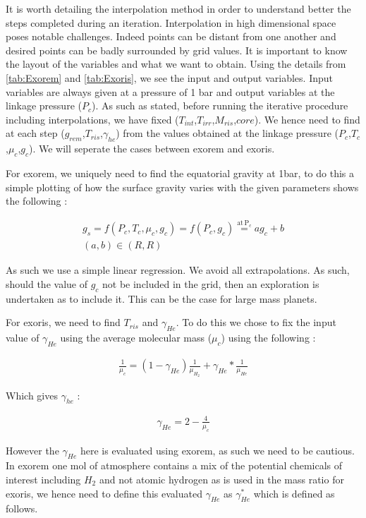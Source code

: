 It is worth detailing the interpolation method in order to understand better the steps completed during an iteration. Interpolation in high dimensional space poses notable challenges. Indeed points can be distant from one another and desired points can be badly surrounded by grid values. It is important to know the layout of the variables and what we want to obtain. Using the details from \cref{tab:Exorem} and \cref{tab:Exoris}, we see the input and output variables. Input variables are always given at a pressure of 1 bar and output variables at the linkage pressure ($P_c$). As such as stated, before running the iterative procedure including interpolations, we have fixed ($T_{int}$,$T_{irr}$,$M_{ris}$,$core$). We hence need to find at each step ($g_{rem}$,$T_{ris}$,$\gamma_{he}$) from the values obtained at the linkage pressure ($P_c$,$T_c$,$\mu_c$,$g_c$). We will seperate the cases between exorem and exoris.\par

For exorem, we uniquely need to find the equatorial gravity at 1bar, to do this a simple plotting of how the surface gravity varies with the given parameters shows the following :

\begin{align} 
    g_s = f(P_c,T_c,\mu_c,g_c) = f(P_c, g_c) \overset{\mathrm{at \, P_c}}{=} ag_c + b \\
    (a,b) \in (R,R) \nonumber
\end{align}

As such we use a simple linear regression. We avoid all extrapolations. As such, should the value of $g_c$ not be included in the grid, then an exploration is undertaken as to include it. This can be the case for large mass planets.\par

For exoris, we need to find $T_{ris}$ and $\gamma_{He}$. To do this we chose to fix the input value of $\gamma_{He}$ using the average molecular mass ($\mu_c$) using the following :

\begin{align} 
    \frac{1}{\mu_c} = (1-\gamma_{He})\frac{1}{\mu_{H_2}} + \gamma_{He}*\frac{1}{\mu_{He}}
\end{align}

Which gives $\gamma_{he}$ :

\begin{align} 
    \gamma_{He} = 2-\frac{4}{\mu_c}
\end{align}

However the $\gamma_{He}$ here is evaluated using exorem, as such we need to be cautious. In exorem one mol of atmosphere contains a mix of the potential chemicals of interest including $H_2$ and not atomic hydrogen as is used in the mass ratio for exoris, we hence need to define this evaluated $\gamma_{He}$ as $\gamma_{He}^*$ which is defined as follows.

